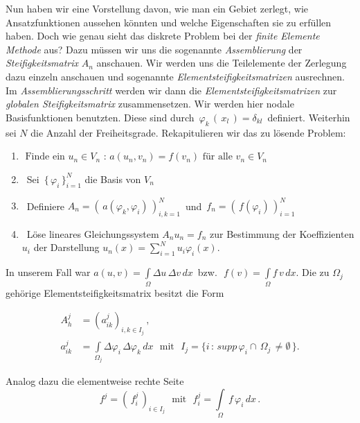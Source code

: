 Nun haben wir eine Vorstellung davon, wie man ein Gebiet zerlegt, wie Ansatzfunktionen aussehen könnten und welche Eigenschaften sie zu erfüllen haben. Doch wie genau sieht das diskrete Problem bei der \textit{finite Elemente Methode} aus? Dazu müssen wir uns die sogenannte \textit{Assemblierung} der \textit{Steifigkeitsmatrix} $A_n$ anschauen. Wir werden uns die Teilelemente der Zerlegung dazu einzeln anschauen und sogenannte \textit{Elementsteifigkeitsmatrizen} ausrechnen. Im \textit{Assemblierungsschritt} werden wir dann die  \textit{Elementsteifigkeitsmatrizen} zur \textit{globalen Steifigkeitsmatrix} zusammensetzen.
Wir werden hier nodale Basisfunktionen benutzten. Diese sind durch $\, \varphi_k \, ( \, x_l \, ) = \delta_{kl} \,$ definiert. Weiterhin sei $N$ die Anzahl der Freiheitsgrade. Rekapitulieren wir das zu lösende Problem:

\begin{framed}
\begin{enumerate}
\item $
\text{ Finde ein } u_n \in V_n \text{ : } a(u_n,v_n) = f(v_n) \text{ für alle } v_n \in V_n
$
\item ~Sei $\, \{ \, \varphi_i \, \}_{i=1}^{N}$ die Basis  von $V_n$
\item ~Definiere $A_n=( \, a(\varphi_k,\varphi_i) \, )_{i,k=1}^{N} \, $ und $ \, f_n=( \, f(\varphi_i) \, )_{i=1}^{N}$
\item ~Löse lineares Gleichungssystem $A_n u_n=f_n$ zur Bestimmung der Koeffizienten $u_i$ der Darstellung $u_n(x)=\sum_{i=1}^{N} u_i \varphi_i(x)$.
\end{enumerate}
\end{framed}

In unserem Fall war $a(u,v)=\int\limits_{\Omega} \Delta u \, \Delta v \, dx \, $ bzw. $\, \, f(v)=\int\limits_{\Omega} f \, v \, dx$. Die zu $\Omega_j$ gehörige Elementsteifigkeitsmatrix besitzt die Form

\begin{equation} \label{eq:element}
\begin{aligned}
A_h^j &= (a_{ik}^j)_{i,k \in I_j} \, ,\\
a_{ik}^j &= \int\limits_{\Omega_j} \Delta \varphi_i \, \Delta \varphi_k \, dx \, \, \text{ mit } \, \, 
I_j =\{ i \, : \, supp \, \varphi_i \cap \, \Omega_j \, \neq \emptyset \, \} .
\end{aligned}
\end{equation}

Analog dazu die elementweise rechte Seite
\begin{equation*}
f^j = (\, f_i^j \, )_{i \in I_j} \, \, \text{ mit } \, \, f_i^j = \int\limits_{\Omega} \, f \, \varphi_i \, dx  \, .
\end{equation*}

